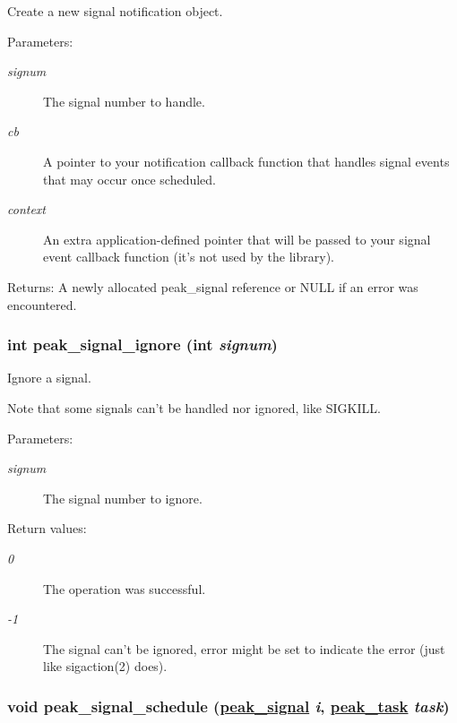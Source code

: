 Create a new signal notification object. 

\begin{Desc}
\item[Parameters:]
\begin{description}
\item[{\em signum}]The signal number to handle. \item[{\em cb}]A pointer to your notification callback function that handles signal events that may occur once scheduled. \item[{\em context}]An extra application-defined pointer that will be passed to your signal event callback function (it's not used by the library).\end{description}
\end{Desc}
\begin{Desc}
\item[Returns:]A newly allocated peak\_\-signal reference or NULL if an error was encountered. \end{Desc}
\hypertarget{group__signal_ga3}{
\subsubsection[peak\_\-signal\_\-ignore]{\setlength{\rightskip}{0pt plus 5cm}int peak\_\-signal\_\-ignore (int {\em signum})}}
\label{group__signal_ga3}


Ignore a signal. 

Note that some signals can't be handled nor ignored, like SIGKILL.

\begin{Desc}
\item[Parameters:]
\begin{description}
\item[{\em signum}]The signal number to ignore.\end{description}
\end{Desc}
\begin{Desc}
\item[Return values:]
\begin{description}
\item[{\em 0}]The operation was successful. \item[{\em -1}]The signal can't be ignored, error might be set to indicate the error (just like sigaction(2) does). \end{description}
\end{Desc}
\hypertarget{group__signal_ga4}{
\subsubsection[peak\_\-signal\_\-schedule]{\setlength{\rightskip}{0pt plus 5cm}void peak\_\-signal\_\-schedule (\hyperlink{group__signal_ga0}{peak\_\-signal} {\em i}, \hyperlink{group__task__common_ga0}{peak\_\-task} {\em task})}}
\label{group__signal_ga4}


